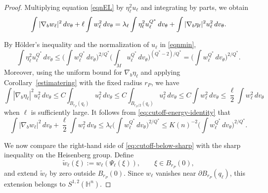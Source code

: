 \documentclass[11pt]{article}
\numberwithin{equation}{section}
\numberwithin{equation}{section}
\begin{document}
\begin{proof}
Multiplying equation \eqref{eqnEL}
by \(\eta_\ell^2u_\ell\) and integrating by parts, we obtain
\begin{equation}\label{eq:cutoff-energy-identity}
\int|\nabla_bw_\ell|^2\,dv_\theta
+
\ell\int w_\ell^2\,dv_\theta=
\lambda_\ell
\int\eta_\ell^2u_\ell^{Q^*}\,dv_\theta \\
+
\int|\nabla_b\eta_\ell|^2u_\ell^2\,dv_\theta.
\end{equation}

By H\"older's inequality and the normalization of \(u_\ell\) in \eqref{eqnmin},
\[
\int\eta_\ell^2u_\ell^{Q^*}\,dv_\theta
\le
\Big(\int w_\ell^{Q^*}\,dv_\theta\Big)^{2/Q^*}
\Big(\int_Mu_\ell^{Q^*}\,dv_\theta\Big)^{(Q^*-2)/Q^*}
=
\Big(\int w_\ell^{Q^*}\,dv_\theta\Big)^{2/Q^*}.
\]
Moreover, using the uniform bound for \(\nabla_b\eta_\ell\) and applying Corollary~\ref{estimatering} with the fixed radius \(r_P\), we have
\[
\int|\nabla_b\eta_\ell|^2u_\ell^2\,dv_\theta
\le
C\int_{B_{r_P}(q_\ell)}u_\ell^2\,dv_\theta 
\le
C\int_{B_{r_P/2}(q_\ell)}u_\ell^2\,dv_\theta 
\le
C\int w_\ell^2\,dv_\theta \le \frac{\ell}{2}\int w_\ell^2\,dv_\theta
\]
when \(\ell\) is sufficiently large.
It follows from \eqref{eq:cutoff-energy-identity} that
\begin{equation}\label{eq:cutoff-below-sharp}
\int|\nabla_bw_\ell|^2\,dv_\theta
+
\frac{\ell}{2}\int w_\ell^2\,dv_\theta
\le
\lambda_\ell
\Big(\int w_\ell^{Q^*}\,dv_\theta\Big)^{2/Q^*}\le K(n)^{-2}
\Big(\int w_\ell^{Q^*}\,dv_\theta\Big)^{2/Q^*}.
\end{equation}

We now compare the right-hand side of
\eqref{eq:cutoff-below-sharp} with the sharp inequality on the Heisenberg
group.  Define
\[
\widetilde w_\ell(\xi)
:=
w_\ell(\Psi_\ell(\xi)),
\qquad
\xi\in B_{r_P}(0),
\]
and extend \(\widetilde w_\ell\) by zero outside \(B_{r_P}(0)\).
Since \(w_\ell\) vanishes near \(\partial B_{r_P}(q_\ell)\), this extension
belongs to \(S^{1,2}(\mathbb H^n)\).



\end{proof}
\end{document}
